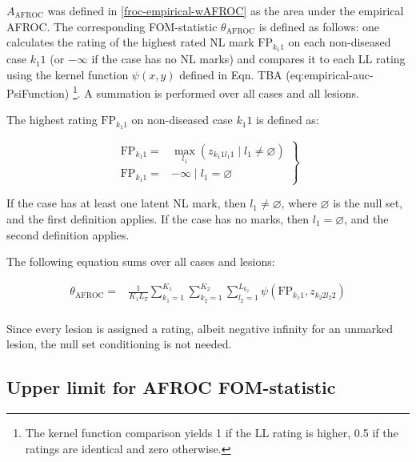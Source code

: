 \documentclass[
]{book}
\begin{document}
\(A_{\text{AFROC}}\) was defined in \ref{froc-empirical-wAFROC} as the area under the empirical AFROC. The corresponding FOM-statistic \(\theta_{\text{AFROC}}\) is defined as follows: one calculates the rating of the highest rated NL mark \(\text{FP}_{k_1 1}\) on each non-diseased case \(k_1 1\) (or \(-\infty\) if the case has no NL marks) and compares it to each LL rating using the kernel function \(\psi(x,y)\) defined in Eqn. TBA (eq:empirical-auc-PsiFunction) \footnote{The kernel function comparison yields 1 if the LL rating is higher, 0.5 if the ratings are identical and zero otherwise.}. A summation is performed over all cases and all lesions.

The highest rating \(\text{FP}_{k_1 1}\) on non-diseased case \(k_1 1\) is defined as:

\begin{equation}
\left.
\begin{aligned}
\text{FP}_{k_1 1}  =&  \max_{l_1} \left ( z_{k_1 1 l_1 1} \mid  l_1 \neq \varnothing \right )\\
\text{FP}_{k_1 1}  =&  -\infty\mid l_1 = \varnothing
\end{aligned}
\right \}
\label{eq:froc-meanings-R-k1}
\end{equation}

If the case has at least one latent NL mark, then \(l_1 \neq \varnothing\), where \(\varnothing\) is the null set, and the first definition applies. If the case has no marks, then \(l_1 = \varnothing\), and the second definition applies.

The following equation sums over all cases and lesions:

\begin{equation}
\begin{aligned} 
\theta_{\text{AFROC}} =& \frac{1}{K_1 L_T}\sum_{k_1=1}^{K_1}\sum_{k_2=1}^{K_2}\sum_{l_2=1}^{L_{k_2}}\psi\left ( \text{FP}_{k_1 1}, z_{k_2 2 l_2 2} \right )\\
\end {aligned}
\label{eq:froc-meanings-theta-afroc}
\end{equation}

Since every lesion is assigned a rating, albeit negative infinity for an unmarked lesion, the null set conditioning is not needed.

\hypertarget{upper-limit-for-afroc-fom-statistic}{%
\subsection{Upper limit for AFROC FOM-statistic}\label{upper-limit-for-afroc-fom-statistic}}
\end{document}
